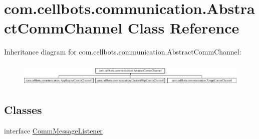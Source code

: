 \hypertarget{classcom_1_1cellbots_1_1communication_1_1_abstract_comm_channel}{\section{com.\-cellbots.\-communication.\-Abstract\-Comm\-Channel Class Reference}
\label{classcom_1_1cellbots_1_1communication_1_1_abstract_comm_channel}
}
Inheritance diagram for com.\-cellbots.\-communication.\-Abstract\-Comm\-Channel\-:\begin{figure}[H]
\begin{center}
\leavevmode
\includegraphics[height=1.148718cm]{classcom_1_1cellbots_1_1communication_1_1_abstract_comm_channel}
\end{center}
\end{figure}
\subsection*{Classes}
\begin{DoxyCompactItemize}
\item 
interface \hyperlink{interfacecom_1_1cellbots_1_1communication_1_1_abstract_comm_channel_1_1_comm_message_listener}{Comm\-Message\-Listener}
\end{DoxyCompactItemize}
